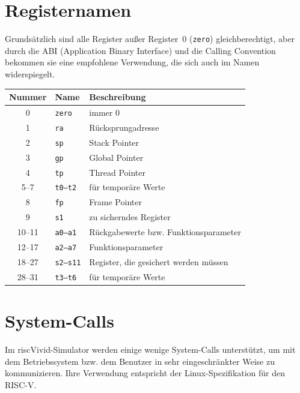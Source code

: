 \documentclass[a4paper,11pt]{article}
\begin{document}
	\newpage
	\appendix
	
	\section{Registernamen}
	
	Grundsätzlich sind alle Register außer Register~0 (\texttt{zero}) gleichberechtigt, aber durch die ABI (Application Binary Interface) und die Calling Convention bekommen sie eine empfohlene Verwendung, die sich auch im Namen widerspiegelt.
	
	\begin{center}
		\begin{tabular}{clp{7cm}}
			\toprule
			\textbf{Nummer} & \textbf{Name} & \textbf{Beschreibung} \\
			\midrule
			0     & \texttt{zero}       & immer 0 \\
			1     & \texttt{ra}         & Rücksprungadresse \\
			2     & \texttt{sp}         & Stack Pointer \\
			3     & \texttt{gp}         & Global Pointer \\
			4     & \texttt{tp}         & Thread Pointer \\
			5--7  & \texttt{t0--t2}     & für temporäre Werte \\
			8     & \texttt{fp}         & Frame Pointer \\
			9     & \texttt{s1}         & zu sicherndes Register \\
			10--11 & \texttt{a0--a1}   & Rückgabewerte bzw. Funktionsparameter \\
			12--17 & \texttt{a2--a7}   & Funktionsparameter \\
			18--27 & \texttt{s2--s11}  & Register, die gesichert werden müssen \\
			28--31 & \texttt{t3--t6}   & für temporäre Werte \\
			\bottomrule
		\end{tabular}
	\end{center}
	
	\section{System-Calls}
	
	Im riscVivid-Simulator werden einige wenige System-Calls unterstützt, um mit dem Betriebssystem bzw. dem Benutzer in sehr eingeschränkter Weise zu kommunizieren.
	Ihre Verwendung entspricht der Linux-Spezifikation für den RISC-V.
	
\end{document}
